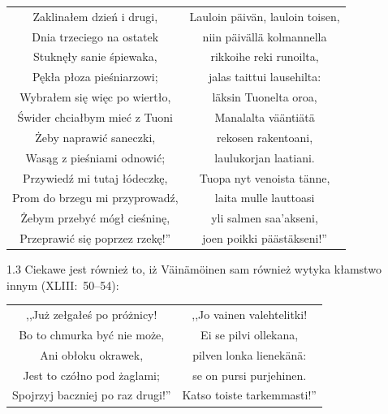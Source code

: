 \documentclass[11pt,a4paper,twoside]{report}
\begin{document}
{\begin{longtable}{c c}
Zaklinałem dzień i drugi, 		&  Lauloin päivän, lauloin toisen, \\
Dnia trzeciego na ostatek		&  niin päivällä kolmannella \\
Stuknęły sanie śpiewaka, 		&  rikkoihe reki runoilta, \\
Pękła płoza pieśniarzowi; 		&  jalas taittui lausehilta: \\
Wybrałem się więc po wiertło, 		&  läksin Tuonelta oroa, \\
Świder chciałbym mieć z Tuoni		&  Manalalta vääntiätä \\
Żeby naprawić saneczki, 			&  rekosen rakentoani, \\
Wasąg z pieśniami odnowić; 		&  laulukorjan laatiani. \\
Przywiedź mi tutaj łódeczkę, 		&  Tuopa nyt venoista tänne, \\
Prom do brzegu mi przyprowadź, 	&  laita mulle lauttoasi \\
Żebym przebyć mógł cieśninę, 		&  yli salmen saa'akseni, \\
Przeprawić się poprzez rzekę!'' 		&  joen poikki päästäkseni!'' \\
\end{longtable}
}
\begin{spacing}{1.3}
Ciekawe jest również to, iż Väinämöinen sam również wytyka kłamstwo innym (XLIII:~50--54):
\end{spacing}
{\centering
\small
\begin{longtable}{c c}
,,Już zełgałeś po próżnicy! 		&  ,,Jo vainen valehtelitki! \\
Bo to chmurka być nie może, 		&  Ei se pilvi ollekana, \\
Ani obłoku okrawek, 			&  pilven lonka lienekänä: \\
Jest to czółno pod żaglami; 		&  se on pursi purjehinen. \\
Spojrzyj baczniej po raz drugi!'' 		&  Katso toiste tarkemmasti!'' \\
\end{longtable}
}
\vspace*{0.5\baselineskip}
\end{document}
